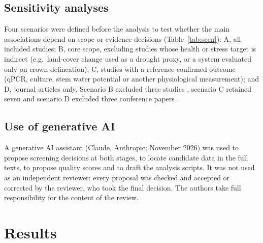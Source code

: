 \documentclass[preprint,12pt]{elsarticle}
\begin{document}
\subsection{Sensitivity analyses}
Four scenarios were defined before the analysis to test whether the main associations depend on scope or evidence decisions (Table~\ref{tab:scen}): A, all included studies; B, core scope, excluding studies whose health or stress target is indirect (e.g.\ land-cover change used as a drought proxy, or a system evaluated only on crown delineation); C, studies with a reference-confirmed outcome (qPCR, culture, stem water potential or another physiological measurement); and D, journal articles only. Scenario B excluded three studies \citep{u021,u138,u135}, scenario C retained seven \citep{u008,u030,u081,u106,u108,u113,u133} and scenario D excluded three conference papers \citep{u108,kallel2022olive,u135}.
 
\subsection{Use of generative AI}\label{sec:genai}
A generative AI assistant (Claude, Anthropic; November 2026) was used to propose screening decisions at both stages, to locate candidate data in the full texts, to propose quality scores and to draft the analysis scripts. It was not used as an independent reviewer: every proposal was checked and accepted or corrected by the reviewer, who took the final decision. The authors take full responsibility for the content of the review.
 
\section{Results}\label{sec:results}
 
\end{document}

